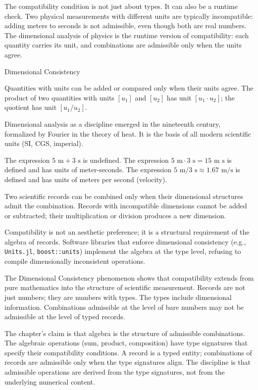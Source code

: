 The compatibility condition is not just about types. It can also
be a runtime check. Two physical measurements with different
units are typically incompatible: adding meters to seconds is not
admissible, even though both are real numbers. The dimensional
analysis of physics is the runtime version of compatibility: each
quantity carries its unit, and combinations are admissible only
when the units agree.

\begin{phenom}{Dimensional Consistency}
\label{ph:dimensional-consistency}

\PhStatement Quantities with units can be added or compared only when
their units agree. The product of two quantities with units $[u_1]$
and $[u_2]$ has unit $[u_1 \cdot u_2]$; the quotient has unit $[u_1 /
u_2]$.

\PhOrigin Dimensional analysis as a discipline emerged in the
nineteenth century, formalized by Fourier in the theory of heat. It
is the basis of all modern scientific units (SI, CGS, imperial).

\PhObservation The expression $5 \text{ m} + 3 \text{ s}$ is undefined.
The expression $5 \text{ m} \cdot 3 \text{ s} = 15 \text{ m s}$ is
defined and has units of meter-seconds. The expression $5 \text{ m}
/ 3 \text{ s} \approx 1.67 \text{ m/s}$ is defined and has units of
meters per second (velocity).

\PhConstraint Two scientific records can be combined only when
their dimensional structures admit the combination. Records with
incompatible dimensions cannot be added or subtracted; their
multiplication or division produces a new dimension.

\PhConsequence Compatibility is not an aesthetic preference; it is
a structural requirement of the algebra of records. Software
libraries that enforce dimensional consistency (e.g.,
\texttt{Units.jl}, \texttt{boost::units}) implement the algebra at
the type level, refusing to compile dimensionally inconsistent
operations.

\end{phenom}

The Dimensional Consistency phenomenon shows that compatibility
extends from pure mathematics into the structure of scientific
measurement. Records are not just numbers; they are numbers with
types. The types include dimensional information. Combinations
admissible at the level of bare numbers may not be admissible at
the level of typed records.

The chapter's claim is that algebra is the structure of admissible
combinations. The algebraic operations (sum, product, composition)
have type signatures that specify their compatibility conditions. A
record is a typed entity; combinations of records are admissible
only when the type signatures align. The discipline is that
admissible operations are derived from the type signatures, not
from the underlying numerical content.

